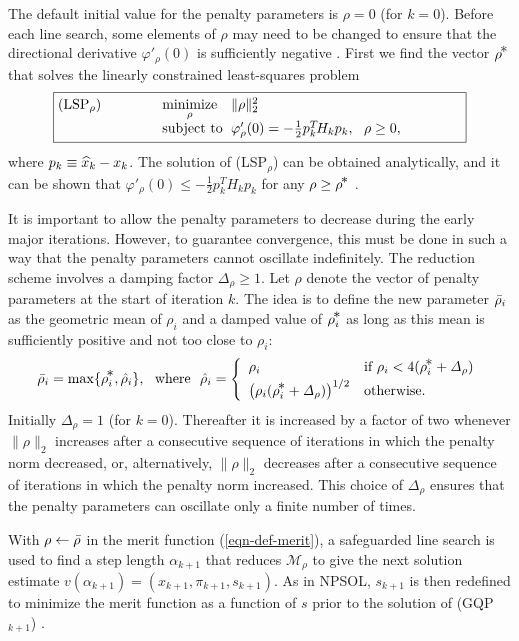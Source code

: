 \documentclass[draft,leqno,onefignum,onetabnum]{siamltex}
\makeatletter
\def\varDelta{{\mathit\Delta}}
\def\Deltait{\varDelta}
\def\half  {{\textstyle{\frac12}}}
\def\kp#1{_{k+#1}}
\def\Mscr{{\mathcal M}}
\def\minim{\mathop{\hbox{\rm minimize}}}
\def\minimize#1{{\displaystyle\minim_{#1}}}
\def\norm#1{\|#1\|}
\def\nthinsp{\mskip -2   mu}
\def\subject{\mbox{\rm subject to}}
\def\superstar{^{\raise 0.5pt\hbox{$\nthinsp *$}}}
\def\T{^T\!}
\def\xhat{\skew{2.8}\widehat x}
\def\GQP#1{GQP$_{#1}$}
\def\NPSOL {{\small NPSOL}}
\def\problem#1#2#3#4{\fbox
   {\begin{tabular*}{0.84\textwidth}
    {@{}l@{\extracolsep{\fill}}l@{\extracolsep{6pt}}l@{\extracolsep{\fill}}c@{}}
      #1 & $\minimize{#2}$ & $#3$ & $ $ \\[5pt]
         & $\subject$      & $#4$ & $ $
    \end{tabular*}}}
\newcommand{\rhobar}{\skew4\bar\rho}
\newcommand{\rhohat}{\skew4\hat\rho}
\newcommand{\rhostar}{\rho\superstar}
\newcommand{\twonorm}[1]{\norm{#1}_2}
\makeatother
\begin{document}
The default initial value for the penalty parameters is
$\rho = 0$ (for $k=0$).  Before each line search,
some elements of $\rho$ may need to be changed
to ensure that the directional derivative $\varphi'_\rho(0)$ is
sufficiently negative \cite{GilMSW92}.
First we find the vector $\rhostar$ that solves the
linearly constrained least-squares problem
\[
   \problem{(LSP$_\rho$)}{\rho}
           {\twonorm{\rho}^2}
           {\varphi'_\rho(0) = -\half p_k\T H_k p_k,\ \ \rho \ge 0,}
\]
where $p_k \equiv \xhat_k - x_k$.  The solution of (LSP$_\rho$)
can be obtained analytically, and it can be shown that
$\varphi'_\rho(0) \le -\half p_k\T H_k p_k$
for any $\rho \ge \rhostar$ \cite{Eld91,GilMSW86a,GilMSW92}.

It is important to allow the penalty parameters to decrease during
the early major iterations.  However, to guarantee convergence, this
must be done in such a way that the penalty parameters cannot
oscillate indefinitely.  The reduction scheme involves a damping factor
$\Deltait_\rho \ge 1$.  Let $\rho$ denote
the vector of penalty parameters at the start of iteration $k$.
The idea is to define the new parameter $\rhobar_i$
as the geometric mean of $\rho_i$ and a damped value of
$\rhostar_i$ as long as this mean is sufficiently positive and not too
close to $\rho_i$:
\begin{equation} \label{eqn-penalty-update}
  \rhobar_i = \max\{ \rhostar_i, \rhohat_i \},
  \ \ \mbox{where}\ \
  \rhohat_i = \left\{
    \begin{array}{ll}
       \rho_i           & \hbox{if $\rho_i < 4(\rhostar_i +\Deltait_\rho)$}
 \\[2pt]
      \big(\rho_i(\rhostar_i + \Deltait_\rho)\big)^{1/2} & \hbox{otherwise.}
    \end{array}
  \right.
\end{equation}
Initially $\Deltait_\rho=1$ (for $k=0$).  Thereafter it is increased
by a factor of two whenever $\twonorm{\rho}$ increases after a
consecutive sequence of iterations in which the penalty norm
decreased, or, alternatively, $\twonorm{\rho}$ decreases after a
consecutive sequence of iterations in which the penalty norm
increased.  This choice of $\Deltait_\rho$ ensures that the penalty
parameters can oscillate only a finite number of times.

With $\rho \leftarrow \rhobar$ in the merit function (\ref{eqn-def-merit}),
a safeguarded line search is used to find a step length $\alpha\kp1$
that reduces $\Mscr_\rho$ to give the next solution
estimate $v(\alpha\kp1) = (x\kp1,\pi\kp1,s\kp1)$.
As in \NPSOL, $s\kp1$ is then redefined
to minimize the merit function as a function of $s$ prior to the
solution of (\GQP{k+1}) \cite{GilMSW86a,Eld91}.
\end{document}
